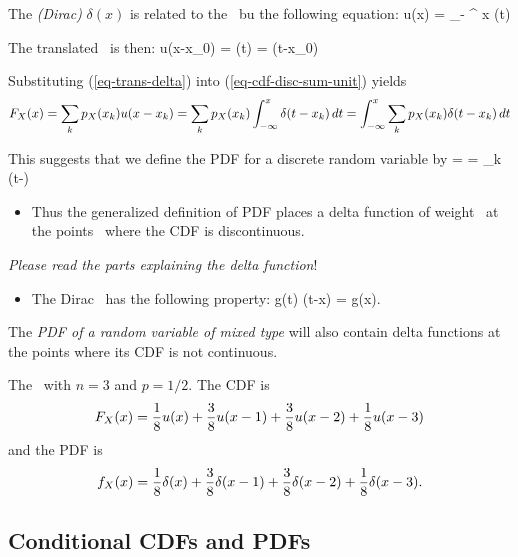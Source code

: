 	\item The \emph{(Dirac) \delfcn} $\delta(x)$
	is related to the \unitfcn\ bu the following equation:
		u(x) = \int_{-\infty} ^ x \delta(t) \dt
	\eeql

	\item The translated \unitfcn\ is then:
		u(x-x_0) =  \delta(t) \dt
		=  \delta(t-x_0) \dt
	\eeql

	\item Substituting (\ref{eq-trans-delta}) into (\ref{eq-cdf-disc-sum-unit})
	yields
	\begin{eqnarray*}
		F_{X}(x)
		=  \sum_k p_{X}(x_k) u(x-x_k)
		=  \sum_k p_{X}(x_k) \int_{-\infty}^{x} \delta(t-x_k) {\, dt}
		=  \int_{-\infty}^{x} \sum_k p_{X}(x_k) \delta(t-x_k) {\, dt}
	\end{eqnarray*}


	\item This suggests that we define the PDF for a discrete random variable
	by
		 =  
		=  \sum_k  \delta(t-\xk) \dt
	\eeql
	\begin{itemize}
		\item
		Thus the generalized definition of PDF places
		a delta function of weight \ at the points \xk\
		where the CDF is discontinuous.
	\end{itemize}

	\item \emph{Please read the parts explaining the delta function}!
	\begin{itemize}
		\item The Dirac \delfcn\ has the following property:
			\intinftoinf g(t) \delta(t-x) \dt = g(x).
		\eeql
	\end{itemize}

	\item The \emph{PDF of a random variable of mixed type}
	will also contain delta functions at the points where its CDF is not continuous.

	\item {}
	The \binomrv\ with $n=3$ and $p=1/2$.
	The CDF is
	\[
		F_{X}(x) =
		\frac{1}{8} u(x)
		+\frac{3}{8} u(x-1)
		+\frac{3}{8} u(x-2)
		+\frac{1}{8} u(x-3)
	\]
	and the PDF is
	\[
		f_{X}(x) =
		\frac{1}{8} \delta(x)
		+\frac{3}{8} \delta(x-1)
		+\frac{3}{8} \delta(x-2)
		+\frac{1}{8} \delta(x-3).
	\]
\eit

\subsection{Conditional CDFs and PDFs}

